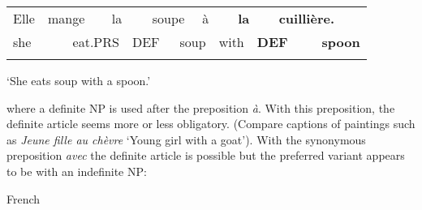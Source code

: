 \begin{tabular}{llllllllllllll}
\lsptoprule
Elle & \multicolumn{2}{l}{mange

} & \multicolumn{2}{l}{la

} & \multicolumn{2}{l}{soupe

} & \multicolumn{2}{l}{à

} & \multicolumn{2}{l}{{\bfseries la}

} & \multicolumn{2}{l}{{\bfseries cuillière.}

} & \\
\multicolumn{2}{l}{she

} & \multicolumn{2}{l}{eat.PRS

} & \multicolumn{2}{l}{DEF

} & \multicolumn{2}{l}{soup

} & \multicolumn{2}{l}{with

} & \multicolumn{2}{l}{{\bfseries DEF}

} & \multicolumn{2}{l}{{\bfseries spoon}

}\\
\lspbottomrule
\end{tabular}

\begin{styleTranslation}
‘She eats soup with a spoon.’

\end{styleTranslation}

\begin{styleBodyTextFirst}
where a definite NP is used after the preposition \textit{à}. With this preposition, the definite article seems more or less obligatory. (Compare captions of paintings such as \textit{Jeune fille au chèvre} ‘Young girl with a goat’). With the synonymous preposition \textit{avec} the definite article is possible but the preferred variant appears to be with an indefinite NP:

\end{styleBodyTextFirst}

\begin{listWWNumileveli}
\item 

\begin{styleExample}
French

\end{styleExample}

\end{listWWNumileveli}

